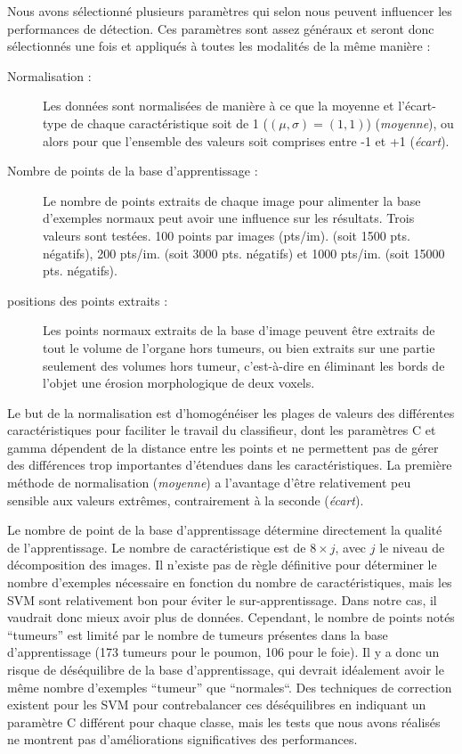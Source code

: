 Nous avons sélectionné plusieurs paramètres qui selon nous peuvent influencer les performances de détection. Ces paramètres sont assez généraux et seront donc sélectionnés une fois et appliqués à toutes les modalités de la même manière :

\begin{description}
 \item[Normalisation :] Les données sont normalisées de manière à ce que la moyenne et l'écart-type de chaque caractéristique soit de 1 ($(\mu, \sigma)=(1,1)$) (\emph{moyenne}), ou alors pour que l'ensemble des valeurs soit comprises entre -1 et +1 (\emph{écart}).
 \item[Nombre de points de la base d'apprentissage :] Le nombre de points extraits de chaque image pour alimenter la base d'exemples normaux peut avoir une influence sur les résultats. Trois valeurs sont testées. 100 points par images (pts/im). (soit 1500 pts. négatifs), 200 pts/im. (soit 3000 pts. négatifs) et 1000 pts/im. (soit 15000 pts. négatifs).
 \item[positions des points extraits :] Les points normaux extraits de la base d'image peuvent être extraits de tout le volume de l'organe hors tumeurs, ou bien extraits sur une partie seulement des volumes hors tumeur, c'est-à-dire en éliminant les bords de l'objet une érosion morphologique de deux voxels.
\end{description}

Le but de la normalisation est d'homogénéiser les plages de valeurs des différentes caractéristiques pour faciliter le travail du classifieur, dont les paramètres C et gamma dépendent de la distance entre les points et ne permettent pas de gérer des différences trop importantes d'étendues dans les caractéristiques. La première méthode de normalisation (\emph{moyenne}) a l'avantage d'être relativement peu sensible aux valeurs extrêmes, contrairement à la seconde (\emph{écart}).

Le nombre de point de la base d'apprentissage détermine directement la qualité de l'apprentissage. Le nombre de caractéristique est de $8 \times j$, avec $j$ le niveau de décomposition des images. Il n'existe pas de règle définitive pour déterminer le nombre d'exemples nécessaire en fonction du nombre de caractéristiques, mais les SVM sont relativement bon pour éviter le sur-apprentissage. Dans notre cas, il vaudrait donc mieux avoir plus de données. Cependant, le nombre de points notés ``tumeurs'' est limité par le nombre de tumeurs présentes dans la base d'apprentissage (173 tumeurs pour le poumon, 106 pour le foie). Il y a donc un risque de déséquilibre de la base d'apprentissage, qui devrait idéalement avoir le même nombre d'exemples ``tumeur'' que ``normales``. Des techniques de correction existent pour les SVM pour contrebalancer ces déséquilibres en indiquant un paramètre C différent pour chaque classe, mais les tests que nous avons réalisés ne montrent pas d'améliorations significatives des performances.

